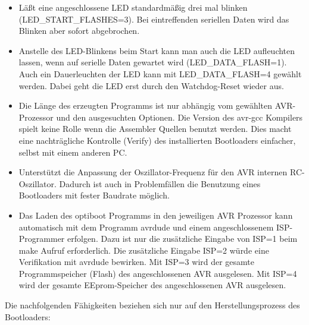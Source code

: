 \begin{itemize}
\item {Läßt eine angeschlossene LED standardmäßig drei mal blinken (LED\_START\_FLASHES=3).
	Bei eintreffenden seriellen Daten wird das Blinken aber sofort abgebrochen.}

\item {Anstelle des LED-Blinkens beim Start kann man auch die LED aufleuchten lassen, wenn 
	auf serielle Daten gewartet wird (LED\_DATA\_FLASH=1).
       Auch ein Dauerleuchten der LED kann mit LED\_DATA\_FLASH=4 gewählt werden.
       Dabei geht die LED erst durch den Watchdog-Reset wieder aus.}

\item {Die Länge des erzeugten Programms ist nur abhängig vom gewählten AVR-Prozessor
	und den ausgesuchten Optionen.
	Die Version des avr-gcc Kompilers spielt keine Rolle wenn die Assembler Quellen benutzt werden.
	Dies macht eine nachträgliche Kontrolle (Verify) des installierten Bootloaders
	einfacher, selbst mit einem anderen PC.}

\item {Unterstützt die Anpassung der Oszillator-Frequenz für den AVR internen RC-Oszillator.
 	Dadurch ist auch in Problemfällen die Benutzung eines Bootloaders mit fester Baudrate möglich.}

\item {Das Laden des optiboot Programms in den jeweiligen AVR Prozessor kann automatisch mit dem
	Programm avrdude und einem angeschlossenem ISP-Programmer erfolgen.
	Dazu ist nur die zusätzliche Eingabe von ISP=1 beim make Aufruf erforderlich.
	Die zusätzliche Eingabe ISP=2 würde eine Verifikation mit avrdude bewirken.
	Mit ISP=3 wird der gesamte Programmspeicher (Flash) des angeschlossenen AVR ausgelesen.
	Mit ISP=4 wird der gesamte EEprom-Speicher des angeschlossenen AVR ausgelesen.}

\end{itemize}

Die nachfolgenden Fähigkeiten beziehen sich nur auf den Herstellungsprozess des Bootloaders:

